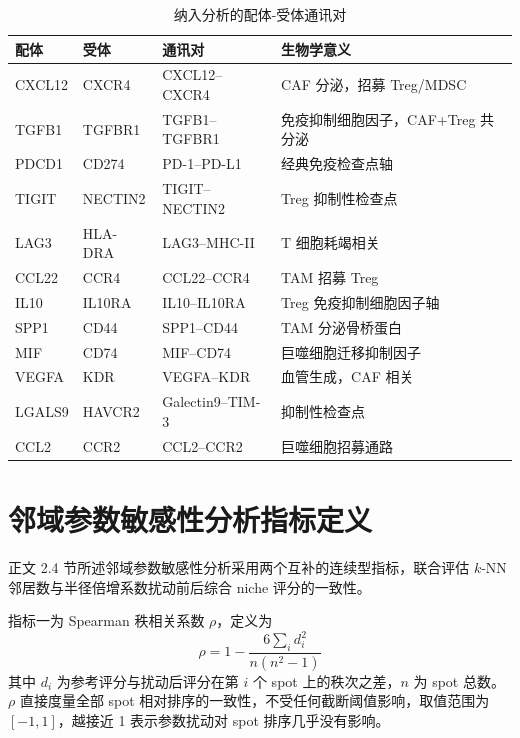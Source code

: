 \documentclass[12pt, a4paper]{ctexart}
\begin{document}
\begin{table}[H]
\centering
\caption{纳入分析的配体-受体通讯对}
\label{tab:lr_pairs}
\begin{tabularx}{\textwidth}{lllX}
\toprule
\textbf{配体} & \textbf{受体} & \textbf{通讯对} & \textbf{生物学意义} \\
\midrule
CXCL12 & CXCR4   & CXCL12--CXCR4  & CAF 分泌，招募 Treg/MDSC~\citep{domanska2013targeting} \\
TGFB1  & TGFBR1  & TGFB1--TGFBR1  & 免疫抑制细胞因子，CAF+Treg 共分泌~\citep{mariathasan2018tgfb} \\
PDCD1  & CD274   & PD-1--PD-L1    & 经典免疫检查点轴~\citep{sharma2023immunosuppressive} \\
TIGIT  & NECTIN2 & TIGIT--NECTIN2 & Treg 抑制性检查点~\citep{sakaguchi2020regulatory} \\
LAG3   & HLA-DRA & LAG3--MHC-II   & T 细胞耗竭相关~\citep{sharma2023immunosuppressive} \\
CCL22  & CCR4    & CCL22--CCR4    & TAM 招募 Treg~\citep{curiel2004specific} \\
IL10   & IL10RA  & IL10--IL10RA   & Treg 免疫抑制细胞因子轴~\citep{noy2014tumor} \\
SPP1   & CD44    & SPP1--CD44     & TAM 分泌骨桥蛋白~\citep{biswas2010macrophage} \\
MIF    & CD74    & MIF--CD74      & 巨噬细胞迁移抑制因子~\citep{noy2014tumor} \\
VEGFA  & KDR     & VEGFA--KDR     & 血管生成，CAF 相关~\citep{kalluri2016biology} \\
LGALS9 & HAVCR2  & Galectin9--TIM-3 & 抑制性检查点~\citep{sharma2023immunosuppressive} \\
CCL2   & CCR2    & CCL2--CCR2     & 巨噬细胞招募通路~\citep{biswas2010macrophage} \\
\bottomrule
\end{tabularx}
\end{table}

\section{邻域参数敏感性分析指标定义}
\label{app:sensitivity}

正文 2.4 节所述邻域参数敏感性分析采用两个互补的连续型指标，联合评估 $k$-NN 邻居数与半径倍增系数扰动前后综合 niche 评分的一致性。

指标一为 Spearman 秩相关系数 $\rho$，定义为
\begin{equation}
\rho = 1 - \frac{6 \sum_i d_i^2}{n(n^2-1)}
\label{eq:spearman}
\end{equation}
其中 $d_i$ 为参考评分与扰动后评分在第 $i$ 个 spot 上的秩次之差，$n$ 为 spot 总数。$\rho$ 直接度量全部 spot 相对排序的一致性，不受任何截断阈值影响，取值范围为 $[-1, 1]$，越接近 1 表示参数扰动对 spot 排序几乎没有影响。
\end{document}
